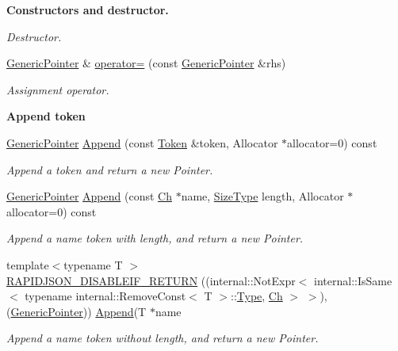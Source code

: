 \begin{Indent}{\bf Constructors and destructor.}
\begin{DoxyCompactItemize}
\begin{DoxyCompactList}\small\item\em Destructor. \end{DoxyCompactList}\item 
\hyperlink{class_generic_pointer}{Generic\+Pointer} \& \hyperlink{class_generic_pointer_a1d0174a6e72daa4024da9e08ce1e7951}{operator=} (const \hyperlink{class_generic_pointer}{Generic\+Pointer} \&rhs)\hypertarget{class_generic_pointer_a1d0174a6e72daa4024da9e08ce1e7951}{}\label{class_generic_pointer_a1d0174a6e72daa4024da9e08ce1e7951}

\begin{DoxyCompactList}\small\item\em Assignment operator. \end{DoxyCompactList}\end{DoxyCompactItemize}
\end{Indent}
\begin{Indent}{\bf Append token}\par
\begin{DoxyCompactItemize}
\item 
\hyperlink{class_generic_pointer}{Generic\+Pointer} \hyperlink{class_generic_pointer_a6d55ac55724890527e583f26b2774f02}{Append} (const \hyperlink{struct_generic_pointer_1_1_token}{Token} \&token, Allocator $\ast$allocator=0) const 
\begin{DoxyCompactList}\small\item\em Append a token and return a new Pointer. \end{DoxyCompactList}\item 
\hyperlink{class_generic_pointer}{Generic\+Pointer} \hyperlink{class_generic_pointer_a0f2c0586fd945bf25a5da228d085f74b}{Append} (const \hyperlink{class_generic_pointer_a38b73c84d37428340066d907f9d4f37f}{Ch} $\ast$name, \hyperlink{rapidjson_8h_a5ed6e6e67250fadbd041127e6386dcb5}{Size\+Type} length, Allocator $\ast$allocator=0) const 
\begin{DoxyCompactList}\small\item\em Append a name token with length, and return a new Pointer. \end{DoxyCompactList}\item 
{\footnotesize template$<$typename T $>$ }\\\hyperlink{class_generic_pointer_aaf4d7d852098878d24188d134182d42f}{R\+A\+P\+I\+D\+J\+S\+O\+N\+\_\+\+D\+I\+S\+A\+B\+L\+E\+I\+F\+\_\+\+R\+E\+T\+U\+RN} ((internal\+::\+Not\+Expr$<$ internal\+::\+Is\+Same$<$ typename internal\+::\+Remove\+Const$<$ T $>$\+::\hyperlink{rapidjson_8h_a1d1cfd8ffb84e947f82999c682b666a7}{Type}, \hyperlink{class_generic_pointer_a38b73c84d37428340066d907f9d4f37f}{Ch} $>$ $>$),(\hyperlink{class_generic_pointer}{Generic\+Pointer})) \hyperlink{class_generic_pointer_a6d55ac55724890527e583f26b2774f02}{Append}(T $\ast$name
\begin{DoxyCompactList}\small\item\em Append a name token without length, and return a new Pointer. \end{DoxyCompactList}\end{DoxyCompactItemize}
\end{Indent}
